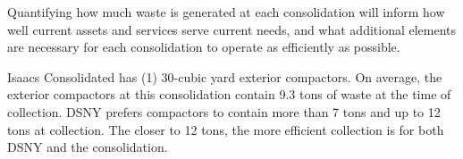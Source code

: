 
    Quantifying how much waste is generated at each consolidation will inform how well current assets and services serve current needs, and what additional elements are necessary for each consolidation to operate as efficiently as possible.
    
    Isaacs Consolidated has (1) 30-cubic yard exterior compactors. On average, the exterior compactors at this consolidation contain 9.3 tons of waste at the time of collection. DSNY prefers compactors to contain more than 7 tons and up to 12 tons at collection. The closer to 12 tons, the more efficient collection is for both DSNY and the consolidation.
